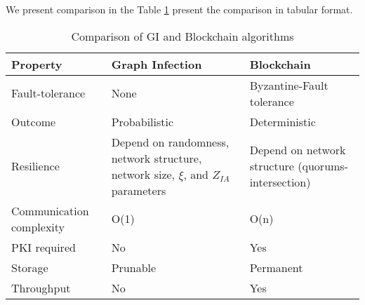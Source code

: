 We present comparison in the Table \ref{table:comparison} present the comparison in tabular format.

\begin{table}[h!]
\centering
\begin{tabular}{ || m{3cm} | m{6cm}| m{6cm} || } 
\hline
\hline
Property & Graph Infection & Blockchain \\ 
\hline\hline
Fault-tolerance & None & Byzantine-Fault tolerance  \\ 
\hline
Outcome & Probabilistic & Deterministic  \\ 
\hline
Resilience & Depend on randomness, network structure, network size, $\xi$, and $Z_{IA}$ parameters & Depend on network structure (quorums-intersection)  \\ 
\hline
Communication complexity & O(1) & O(n)  \\ 
\hline
PKI required & No & Yes  \\ 
\hline
Storage & Prunable & Permanent  \\ 
\hline
Throughput & No & Yes \\
\hline
\end{tabular}
\caption{Comparison of GI and Blockchain algorithms}
\label{table:comparison}
\end{table}

